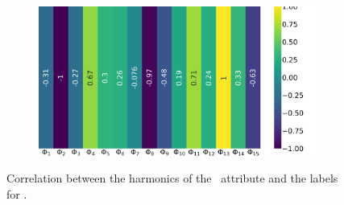 \begin{figure}[!ht]
\begin{subfigure}{0.49\linewidth}
	\end{subfigure}
	\begin{subfigure}{0.49\linewidth}
		\includegraphics[width=\linewidth]{img/qlp_corr/Phi_coil3.png}
	\end{subfigure}
	\caption{Correlation between the harmonics of the \phin\ attribute and the labels for \qlp.}
	\label{fig:phi-lcorr-qlp}
\end{figure}

